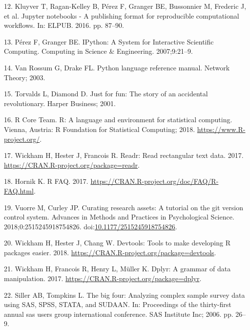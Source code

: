 \documentclass[12pt,oneside]{reedthesis}
\theoremstyle{definition}
\theoremstyle{definition}
\theoremstyle{definition}
\theoremstyle{remark}
\begin{document}
\leavevmode\hypertarget{ref-Kluyver_2016}{}%
12. Kluyver T, Ragan-Kelley B, Pérez F, Granger BE, Bussonnier M,
Frederic J, et al. Jupyter notebooks - A publishing format for
reproducible computational workflows. In: ELPUB. 2016. pp. 87--90.

\leavevmode\hypertarget{ref-Perez_2007}{}%
13. Pérez F, Granger BE. IPython: A System for Interactive Scientific
Computing. Computing in Science \& Engineering. 2007;9:21--9.

\leavevmode\hypertarget{ref-python_2003}{}%
14. Van Rossum G, Drake FL. Python language reference manual. Network
Theory; 2003.

\leavevmode\hypertarget{ref-Torvalds_2001}{}%
15. Torvalds L, Diamond D. Just for fun: The story of an accidental
revolutionary. Harper Business; 2001.

\leavevmode\hypertarget{ref-Rcore_2018}{}%
16. R Core Team. R: A language and environment for statistical
computing. Vienna, Austria: R Foundation for Statistical Computing;
2018. \url{https://www.R-project.org/}.

\leavevmode\hypertarget{ref-readr_2017}{}%
17. Wickham H, Hester J, Francois R. Readr: Read rectangular text data.
2017. \url{https://CRAN.R-project.org/package=readr}.

\leavevmode\hypertarget{ref-Hornik_2017}{}%
18. Hornik K. R FAQ. 2017.
\url{https://CRAN.R-project.org/doc/FAQ/R-FAQ.html}.

\leavevmode\hypertarget{ref-Vuorre_2018}{}%
19. Vuorre M, Curley JP. Curating research assets: A tutorial on the git
version control system. Advances in Methods and Practices in
Psychological Science. 2018;0:2515245918754826.
doi:\href{https://doi.org/10.1177/2515245918754826}{10.1177/2515245918754826}.

\leavevmode\hypertarget{ref-devtools_2018}{}%
20. Wickham H, Hester J, Chang W. Devtools: Tools to make developing R
packages easier. 2018.
\url{https://CRAN.R-project.org/package=devtools}.

\leavevmode\hypertarget{ref-dplyr_2017}{}%
21. Wickham H, Francois R, Henry L, Müller K. Dplyr: A grammar of data
manipulation. 2017. \url{https://CRAN.R-project.org/package=dplyr}.

\leavevmode\hypertarget{ref-Siller_2006}{}%
22. Siller AB, Tompkins L. The big four: Analyzing complex sample survey
data using SAS, SPSS, STATA, and SUDAAN. In: Proceedings of the
thirty-first annual sas users group international conference. SAS
Institute Inc; 2006. pp. 26--9.
\end{document}
